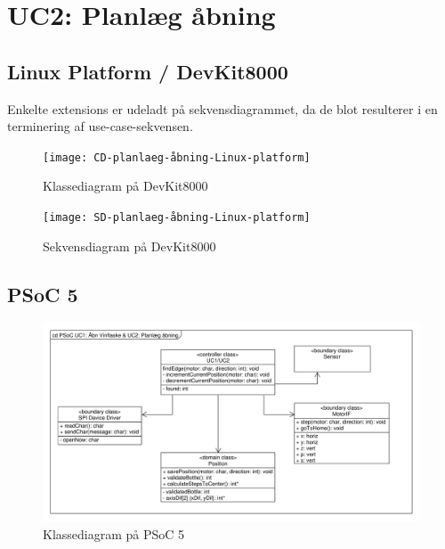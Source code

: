 \section{UC2: Planlæg åbning}

\subsection{Linux Platform / DevKit8000}

Enkelte extensions er udeladt på sekvensdiagrammet, da de blot resulterer i en terminering af use-case-sekvensen.

\begin{figure}[H]
	\caption{Klassediagram  på DevKit8000}
	\label{CD:UC2-devkit}
	\texttt{[image: CD-planlaeg-åbning-Linux-platform]}
\end{figure}

\begin{figure}[H]
	\caption{Sekvensdiagram  på DevKit8000}
	\label{SD:UC2-devkit}
	\texttt{[image: SD-planlaeg-åbning-Linux-platform]}
\end{figure}

\subsection{PSoC 5}
\begin{figure}[H]
	\caption{Klassediagram  på PSoC 5}
	\label{CD:PSoC:UC2-1}
	\includegraphics[scale=0.38,trim=0 0 0 0, clip]{UC1_og_UC2_CD}
\end{figure}


